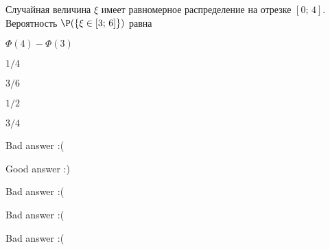 
\begin{question}
Случайная величина \(\xi\) имеет равномерное распределение на отрезке
\([0;\,4]\). Вероятность \(\P(\{\xi \in [3;\,6]\})\) равна
\begin{answerlist}
  \item \(\Phi(4) - \Phi(3)\)
  \item \(1/4\)
  \item \(3/6\)
  \item \(1/2\)
  \item \(3/4\)
\end{answerlist}
\end{question}

\begin{solution}
\begin{answerlist}
  \item Bad answer :(
  \item Good answer :)
  \item Bad answer :(
  \item Bad answer :(
  \item Bad answer :(
\end{answerlist}
\end{solution}

